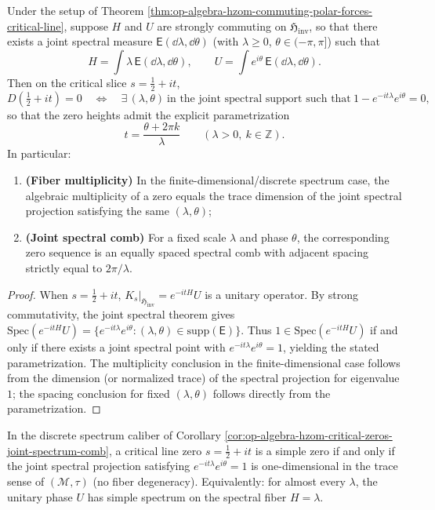 \begin{corollary}\label{cor:op-algebra-hzom-critical-zeros-joint-spectrum-comb}
Under the setup of Theorem \ref{thm:op-algebra-hzom-commuting-polar-forces-critical-line},
suppose \(H\) and \(U\) are strongly commuting on \(\mathfrak{H}_{\mathrm{inv}}\), so that there exists a joint spectral measure \(\mathsf E(\dd\lambda,\dd\theta)\) (with \(\lambda\ge 0\), \(\theta\in(-\pi,\pi]\)) such that
\[
H=\int \lambda\,\mathsf E(\dd\lambda,\dd\theta),
\qquad
U=\int e^{i\theta}\,\mathsf E(\dd\lambda,\dd\theta).
\]
Then on the critical slice \(s=\tfrac12+it\),
\[
D(\tfrac12+it)=0
\quad\Longleftrightarrow\quad
\exists\,(\lambda,\theta)\ \text{in the joint spectral support such that}\ 1-e^{-it\lambda}e^{i\theta}=0,
\]
so that the zero heights admit the explicit parametrization
\[
\boxed{\ t=\frac{\theta+2\pi k}{\lambda}\qquad(\lambda>0,\ k\in\mathbb{Z}).\ }
\]
In particular:
\begin{enumerate}
  \item \textbf{(Fiber multiplicity)} In the finite-dimensional/discrete spectrum case, the algebraic multiplicity of a zero equals the trace dimension of the joint spectral projection satisfying the same \((\lambda,\theta)\);
  \item \textbf{(Joint spectral comb)} For a fixed scale \(\lambda\) and phase \(\theta\), the corresponding zero sequence is an equally spaced spectral comb with adjacent spacing strictly equal to \(2\pi/\lambda\).
\end{enumerate}
\end{corollary}
\begin{proof}
When \(s=\tfrac12+it\), \(K_s|_{\mathfrak{H}_{\mathrm{inv}}}=e^{-itH}U\) is a unitary operator.
By strong commutativity, the joint spectral theorem gives
\(
\mathrm{Spec}(e^{-itH}U)=\{e^{-it\lambda}e^{i\theta}:(\lambda,\theta)\in\mathrm{supp}(\mathsf E)\}
\).
Thus \(1\in\mathrm{Spec}(e^{-itH}U)\) if and only if there exists a joint spectral point with \(e^{-it\lambda}e^{i\theta}=1\), yielding the stated parametrization.
The multiplicity conclusion in the finite-dimensional case follows from the dimension (or normalized trace) of the spectral projection for eigenvalue \(1\); the spacing conclusion for fixed \((\lambda,\theta)\) follows directly from the parametrization. \qedhere
\end{proof}

\begin{corollary}\label{cor:op-algebra-hzom-simple-zeros-joint-spectrum}
In the discrete spectrum caliber of Corollary \ref{cor:op-algebra-hzom-critical-zeros-joint-spectrum-comb},
a critical line zero \(s=\tfrac12+it\) is a simple zero if and only if the joint spectral projection satisfying \(e^{-it\lambda}e^{i\theta}=1\) is one-dimensional in the trace sense of \((\mathcal{M},\tau)\) (no fiber degeneracy).
Equivalently: for almost every \(\lambda\), the unitary phase \(U\) has simple spectrum on the spectral fiber \(H=\lambda\).
\end{corollary}

